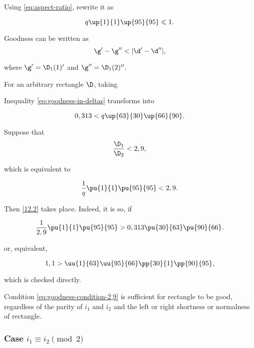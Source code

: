 Using \ref{eq:aspect-ratio}, rewrite it as

\begin{equation*}
	q \up{1}{1} \up{95}{95} \leqslant 1.
\end{equation*}

Goodness can be written as
\begin{equation}\label{eq:goodness-in-deltas}
	\g' - \g'' < |\d' - \d''|,
\end{equation}

where $\g' = \D_1(1)'$ and $\g'' = \D_1(2)''$.

For an arbitrary rectangle $\D$, taking

Inequality \ref{eq:goodness-in-deltas} transforms into

\begin{equation}\label{12.2}
	0,313 < q \up{63}{30} \up{66}{90}.
\end{equation}

Suppose that
%
\begin{equation}\label{eq:goodness-condition-2,9}
	\dfrac{\D_1}{\D_2} < 2,9,
\end{equation}

which is equivalent to

\begin{equation}
	\dfrac{1}{q} \pu{1}{1} \pu{95}{95} < 2,9.
\end{equation}

Then \ref{12.2} takes place. Indeed, it is so, if

\begin{equation*}
	\dfrac{1}{2,9} \pu{1}{1} \pu{95}{95} > 0,313 \pu{30}{63} \pu{90}{66}.
\end{equation*}

or, equivalent,

\begin{equation*}
	1,1 > \uu{1}{63} \uu{95}{66} \pp{30}{1} \pp{90}{95},
\end{equation*}

which is checked directly.

Condition \ref{eq:goodness-condition-2,9} is sufficient for rectangle to be good,
regardless of the parity of $i_1$ and $i_2$ and the left or right shortness or normalness of rectangle.

\subsubsection{Case $i_1 \equiv i_2 \pmod 2$}

